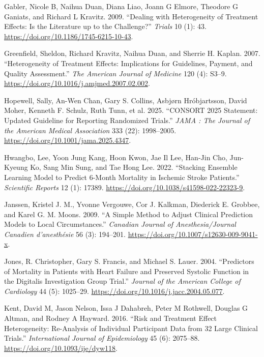 \documentclass{article}
\newlength{\cslhangindent}
\newenvironment{CSLReferences}[2] %
 {\begin{list}{}{%
  \setlength{\itemindent}{0pt}
  \setlength{\leftmargin}{0pt}
  \setlength{\parsep}{0pt}
  \ifodd #1
   \setlength{\leftmargin}{\cslhangindent}
   \setlength{\itemindent}{-1\cslhangindent}
  \fi
  \setlength{\itemsep}{#2\baselineskip}}}
 {\end{list}}
\begin{document}
\begin{CSLReferences}{1}{0}
Gabler, Nicole B, Naihua Duan, Diana Liao, Joann G Elmore, Theodore G
Ganiats, and Richard L Kravitz. 2009. {``Dealing with Heterogeneity of
Treatment Effects: Is the Literature up to the Challenge?''}
\emph{Trials} 10 (1): 43. \url{https://doi.org/10.1186/1745-6215-10-43}.

Greenfield, Sheldon, Richard Kravitz, Naihua Duan, and Sherrie H.
Kaplan. 2007. {``Heterogeneity of {Treatment} {Effects}: {Implications}
for {Guidelines}, {Payment}, and {Quality} {Assessment}.''} \emph{The
American Journal of Medicine} 120 (4): S3--9.
\url{https://doi.org/10.1016/j.amjmed.2007.02.002}.

Hopewell, Sally, An-Wen Chan, Gary S. Collins, Asbjørn Hróbjartsson,
David Moher, Kenneth F. Schulz, Ruth Tunn, et al. 2025. {``{CONSORT}
2025 Statement: {Updated} Guideline for Reporting Randomized Trials.''}
\emph{JAMA : The Journal of the American Medical Association} 333 (22):
1998--2005. \url{https://doi.org/10.1001/jama.2025.4347}.

Hwangbo, Lee, Yoon Jung Kang, Hoon Kwon, Jae Il Lee, Han-Jin Cho,
Jun-Kyeung Ko, Sang Min Sung, and Tae Hong Lee. 2022. {``Stacking
Ensemble Learning Model to Predict 6-Month Mortality in Ischemic Stroke
Patients.''} \emph{Scientific Reports} 12 (1): 17389.
\url{https://doi.org/10.1038/s41598-022-22323-9}.

Janssen, Kristel J. M., Yvonne Vergouwe, Cor J. Kalkman, Diederick E.
Grobbee, and Karel G. M. Moons. 2009. {``A Simple Method to Adjust
Clinical Prediction Models to Local Circumstances.''} \emph{Canadian
Journal of Anesthesia/Journal Canadien d'anesthésie} 56 (3): 194--201.
\url{https://doi.org/10.1007/s12630-009-9041-x}.

Jones, R. Christopher, Gary S. Francis, and Michael S. Lauer. 2004.
{``Predictors of Mortality in Patients with Heart Failure and Preserved
Systolic Function in the {Digitalis Investigation Group} Trial.''}
\emph{Journal of the American College of Cardiology} 44 (5): 1025--29.
\url{https://doi.org/10.1016/j.jacc.2004.05.077}.

Kent, David M, Jason Nelson, Issa J Dahabreh, Peter M Rothwell, Douglas
G Altman, and Rodney A Hayward. 2016. {``Risk and Treatment Effect
Heterogeneity: Re-Analysis of Individual Participant Data from 32 Large
Clinical Trials.''} \emph{International Journal of Epidemiology} 45 (6):
2075--88. \url{https://doi.org/10.1093/ije/dyw118}.


\end{CSLReferences}
\end{document}
